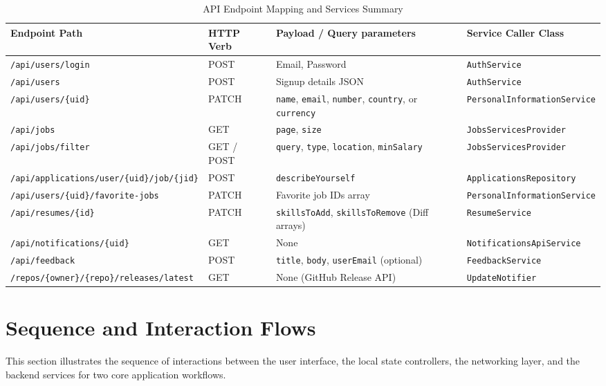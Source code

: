 \begin{table}[htbp]
\centering
\caption{API Endpoint Mapping and Services Summary}
\label{tab:api_endpoints}
\begin{tabular}{|l|p{2cm}|p{4.5cm}|p{4cm}|}
\hline
\textbf{Endpoint Path} & \textbf{HTTP Verb} & \textbf{Payload / Query parameters} & \textbf{Service Caller Class} \\ \hline
\texttt{/api/users/login} & POST & Email, Password & \texttt{AuthService} \\ \hline
\texttt{/api/users} & POST & Signup details JSON & \texttt{AuthService} \\ \hline
\texttt{/api/users/\{uid\}} & PATCH & \texttt{name}, \texttt{email}, \texttt{number}, \texttt{country}, or \texttt{currency} & \texttt{PersonalInformationService} \\ \hline
\texttt{/api/jobs} & GET & \texttt{page}, \texttt{size} & \texttt{JobsServicesProvider} \\ \hline
\texttt{/api/jobs/filter} & GET / POST & \texttt{query}, \texttt{type}, \texttt{location}, \texttt{minSalary} & \texttt{JobsServicesProvider} \\ \hline
\texttt{/api/applications/user/\{uid\}/job/\{jid\}} & POST & \texttt{describeYourself} & \texttt{ApplicationsRepository} \\ \hline
\texttt{/api/users/\{uid\}/favorite-jobs} & PATCH & Favorite job IDs array & \texttt{PersonalInformationService} \\ \hline
\texttt{/api/resumes/\{id\}} & PATCH & \texttt{skillsToAdd}, \texttt{skillsToRemove} (Diff arrays) & \texttt{ResumeService} \\ \hline
\texttt{/api/notifications/\{uid\}} & GET & None & \texttt{NotificationsApiService} \\ \hline
\texttt{/api/feedback} & POST & \texttt{title}, \texttt{body}, \texttt{userEmail} (optional) & \texttt{FeedbackService} \\ \hline
\texttt{/repos/\{owner\}/\{repo\}/releases/latest} & GET & None (GitHub Release API) & \texttt{UpdateNotifier} \\ \hline
\end{tabular}
\end{table}

\section{Sequence and Interaction Flows}
This section illustrates the sequence of interactions between the user interface, the local state controllers, the networking layer, and the backend services for two core application workflows.


